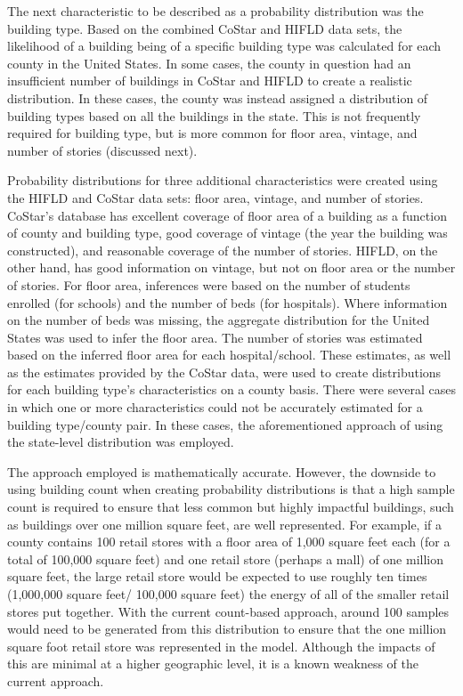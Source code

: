 The next characteristic to be described as a probability distribution was the building type. Based on the combined CoStar and HIFLD data sets, the likelihood of a building being of a specific building type was calculated for each county in the United States. In some cases, the county in question had an insufficient number of buildings in CoStar and HIFLD to create a realistic distribution. In these cases, the county was instead assigned a distribution of building types based on all the buildings in the state. This is not frequently required for building type, but is more common for floor area, vintage, and number of stories (discussed next).

Probability distributions for three additional characteristics were created using the HIFLD and CoStar data sets: floor area, vintage, and number of stories. CoStar's database has excellent coverage of floor area of a building as a function of county and building type, good coverage of vintage (the year the building was constructed), and reasonable coverage of the number of stories. HIFLD, on the other hand, has good information on vintage, but not on floor area or the number of stories. For floor area, inferences were based on the number of students enrolled (for schools) and the number of beds (for hospitals). Where information on the number of beds was missing, the aggregate distribution for the United States was used to infer the floor area. The number of stories was estimated based on the inferred floor area for each hospital/school. These estimates, as well as the estimates provided by the CoStar data, were used to create distributions for each building type's characteristics on a county basis. There were several cases in which one or more characteristics could not be accurately estimated for a building type/county pair. In these cases, the aforementioned approach of using the state-level distribution was employed.

The approach employed is mathematically accurate. However, the downside to using building count when creating probability distributions is that a high sample count is required to ensure that less common but highly impactful buildings, such as buildings over one million square feet, are well represented. For example, if a county contains 100 retail stores with a floor area of 1,000 square feet each (for a total of 100,000 square feet) and one retail store (perhaps a mall) of one million square feet, the large retail store would be expected to use roughly ten times (1,000,000 square feet/ 100,000 square feet) the energy of all of the smaller retail stores put together. With the current count-based approach, around 100 samples would need to be generated from this distribution to ensure that the one million square foot retail store was represented in the model. Although the impacts of this are minimal at a higher geographic level, it is a known weakness of the current approach.

